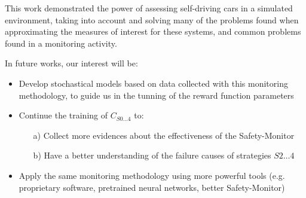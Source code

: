 This work demonstrated the power of assessing self-driving cars in a simulated environment, taking into account and solving many of the problems found when approximating the measures of interest for these systems, and common problems found in a monitoring activity.

In future works, our interest will be:

\begin{itemize}
	\item Develop stochastical models based on data collected with this monitoring methodology, to guide us in the tunning of the reward function parameters
	\item Continue the training of $C_{S0\dots 4}$ to:
	\begin{itemize}
		\item[a)] Collect more evidences about the effectiveness of the Safety-Monitor
		\item[b)] Have a better understanding of the failure causes of strategies $S2\dots 4$
	\end{itemize}
	\item Apply the same monitoring methodology using more powerful tools (e.g. proprietary software, pretrained neural networks, better Safety-Monitor)
\end{itemize}
